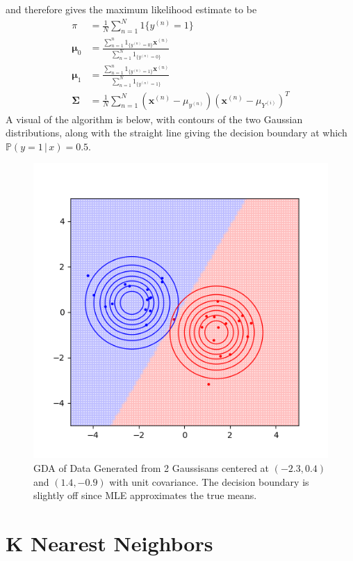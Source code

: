 \documentclass{article}
\theoremstyle{definition}
\begin{document}
  and therefore gives the maximum likelihood estimate to be 
  \begin{align*}
      \pi & = \frac{1}{N} \sum_{n=1}^N 1\{y^{(n)} = 1\} \\
      \boldsymbol{\mu}_0 & = \frac{\sum_{n=1}^n 1_{\{y^{(n)} = 0 \}} \mathbf{x}^{(n)}}{\sum_{n=1}^N 1_{\{y^{(n)} = 0 \}}} \\
      \boldsymbol{\mu}_1 & = \frac{\sum_{n=1}^n 1_{\{y^{(n)} = 1\}} \mathbf{x}^{(n)}}{\sum_{n=1}^N 1_{\{y^{(n)} = 1 \}}} \\
      \boldsymbol{\Sigma} & = \frac{1}{N} \sum_{n=1}^N (\mathbf{x}^{(n)} - \mu_{y^{(n)}}) (\mathbf{x}^{(n)} - \mu_{Y^{(i)}})^T 
  \end{align*}
  A visual of the algorithm is below, with contours of the two Gaussian distributions, along with the straight line giving the decision boundary at which $\mathbb{P}(y=1\,|\,x) = 0.5$. 
  \begin{figure}
      \centering
      \includegraphics[scale=0.7]{img/GDA.png}
      \caption{GDA of Data Generated from 2 Gaussisans centered at $(-2.3, 0.4)$ and $(1.4, -0.9)$ with unit covariance. The decision boundary is slightly off since MLE approximates the true means. }
      \label{fig:gda}
  \end{figure}

\section{K Nearest Neighbors}      
\end{document}
